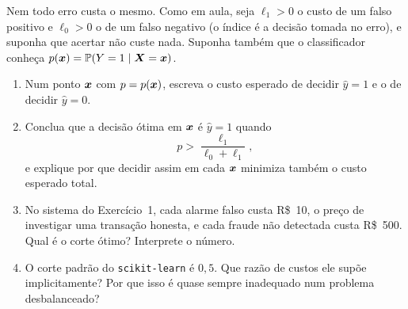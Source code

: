 \documentclass[11pt,a4paper]{article}
\begin{document}
\begin{exercicio}
Nem todo erro custa o mesmo. Como em aula, seja $\ell_1>0$ o custo de um falso
positivo e $\ell_0>0$ o de um falso negativo (o índice é a decisão tomada no erro), e
suponha que acertar não custe nada. Suponha também que o classificador conheça
$p(\bm{x})=\mathbb{P}(Y=1\mid\bm{X}=\bm{x})$.
\begin{enumerate}[label=(\alph*),leftmargin=1.1cm]
  \item Num ponto $\bm{x}$ com $p=p(\bm{x})$, escreva o custo esperado de decidir
        $\widehat y=1$ e o de decidir $\widehat y=0$.
  \item Conclua que a decisão ótima em $\bm{x}$ é $\widehat y=1$ quando
        \[
          p > \frac{\ell_1}{\ell_0+\ell_1},
        \]
        e explique por que decidir assim em cada $\bm{x}$ minimiza também o custo
        esperado total.
  \item No sistema do Exercício~1, cada alarme falso custa R\$~10, o preço de
        investigar uma transação honesta, e cada fraude não detectada custa
        R\$~500. Qual é o corte ótimo? Interprete o número.
  \item O corte padrão do \texttt{scikit-learn} é $0{,}5$. Que razão de custos ele
        supõe implicitamente? Por que isso é quase sempre inadequado num problema
        desbalanceado?
\end{enumerate}
\end{exercicio}
\end{document}
